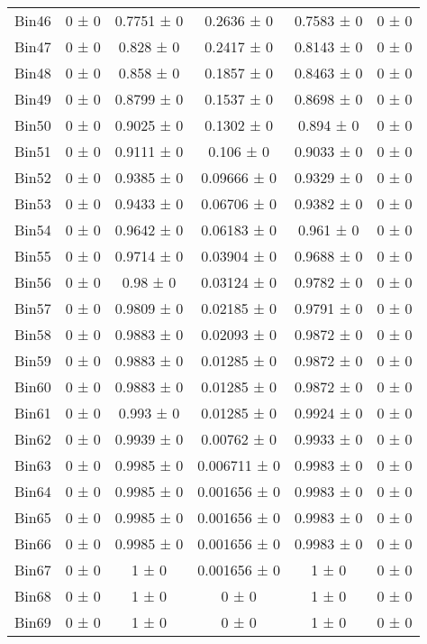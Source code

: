 \begin{tabular}{@{\extracolsep{4pt}}lccccc@{}}
     Bin46 & 0 ± 0 & 0.7751 ± 0 & 0.2636 ± 0 & 0.7583 ± 0 & 0 ± 0 \\ 
     Bin47 & 0 ± 0 & 0.828 ± 0 & 0.2417 ± 0 & 0.8143 ± 0 & 0 ± 0 \\ 
     Bin48 & 0 ± 0 & 0.858 ± 0 & 0.1857 ± 0 & 0.8463 ± 0 & 0 ± 0 \\ 
     Bin49 & 0 ± 0 & 0.8799 ± 0 & 0.1537 ± 0 & 0.8698 ± 0 & 0 ± 0 \\ 
     Bin50 & 0 ± 0 & 0.9025 ± 0 & 0.1302 ± 0 & 0.894 ± 0 & 0 ± 0 \\ 
     Bin51 & 0 ± 0 & 0.9111 ± 0 & 0.106 ± 0 & 0.9033 ± 0 & 0 ± 0 \\ 
     Bin52 & 0 ± 0 & 0.9385 ± 0 & 0.09666 ± 0 & 0.9329 ± 0 & 0 ± 0 \\ 
     Bin53 & 0 ± 0 & 0.9433 ± 0 & 0.06706 ± 0 & 0.9382 ± 0 & 0 ± 0 \\ 
     Bin54 & 0 ± 0 & 0.9642 ± 0 & 0.06183 ± 0 & 0.961 ± 0 & 0 ± 0 \\ 
     Bin55 & 0 ± 0 & 0.9714 ± 0 & 0.03904 ± 0 & 0.9688 ± 0 & 0 ± 0 \\ 
     Bin56 & 0 ± 0 & 0.98 ± 0 & 0.03124 ± 0 & 0.9782 ± 0 & 0 ± 0 \\ 
     Bin57 & 0 ± 0 & 0.9809 ± 0 & 0.02185 ± 0 & 0.9791 ± 0 & 0 ± 0 \\ 
     Bin58 & 0 ± 0 & 0.9883 ± 0 & 0.02093 ± 0 & 0.9872 ± 0 & 0 ± 0 \\ 
     Bin59 & 0 ± 0 & 0.9883 ± 0 & 0.01285 ± 0 & 0.9872 ± 0 & 0 ± 0 \\ 
     Bin60 & 0 ± 0 & 0.9883 ± 0 & 0.01285 ± 0 & 0.9872 ± 0 & 0 ± 0 \\ 
     Bin61 & 0 ± 0 & 0.993 ± 0 & 0.01285 ± 0 & 0.9924 ± 0 & 0 ± 0 \\ 
     Bin62 & 0 ± 0 & 0.9939 ± 0 & 0.00762 ± 0 & 0.9933 ± 0 & 0 ± 0 \\ 
     Bin63 & 0 ± 0 & 0.9985 ± 0 & 0.006711 ± 0 & 0.9983 ± 0 & 0 ± 0 \\ 
     Bin64 & 0 ± 0 & 0.9985 ± 0 & 0.001656 ± 0 & 0.9983 ± 0 & 0 ± 0 \\ 
     Bin65 & 0 ± 0 & 0.9985 ± 0 & 0.001656 ± 0 & 0.9983 ± 0 & 0 ± 0 \\ 
     Bin66 & 0 ± 0 & 0.9985 ± 0 & 0.001656 ± 0 & 0.9983 ± 0 & 0 ± 0 \\ 
     Bin67 & 0 ± 0 & 1 ± 0 & 0.001656 ± 0 & 1 ± 0 & 0 ± 0 \\ 
     Bin68 & 0 ± 0 & 1 ± 0 & 0 ± 0 & 1 ± 0 & 0 ± 0 \\ 
     Bin69 & 0 ± 0 & 1 ± 0 & 0 ± 0 & 1 ± 0 & 0 ± 0 \\ 

\end{tabular}
